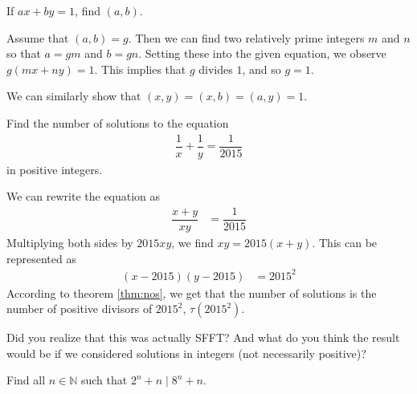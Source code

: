 \documentclass{subfile}
\begin{document}
		\begin{problem}
			If $ax+by=1$, find $(a,b)$.\label{prob:d1}
		\end{problem}

		\begin{solution}
			Assume that $(a,b)=g$. Then we can find two relatively prime integers $m$ and $n$ so that $a=gm$ and $b=gn$. Setting these into the given equation, we observe $g(mx+ny)=1$. This implies that $g$ divides $1$, and so $g=1$.
		\end{solution}

		\begin{note}
			We can similarly show that $(x,y)=(x,b)=(a,y)=1$.
		\end{note}

		\begin{problem}
			Find the number of solutions to the equation
			\begin{align*}
				\dfrac{1}{x}+\dfrac{1}{y}=\dfrac{1}{2015}
			\end{align*}
			in positive integers.
		\end{problem}

		\begin{solution}
			We can rewrite the equation as
				\begin{align*}
					\dfrac{x+y}{xy} & = \dfrac{1}{2015}
				\end{align*}
			Multiplying both sides by $2015xy$, we find $xy=2015(x+y)$. This can be represented as
				\begin{align*}
					(x-2015)(y-2015) & = 2015^2
				\end{align*}
			According to theorem \autoref{thm:nos}, we get that the number of solutions is the number of positive divisors of $2015^2$, $\tau(2015^2)$.
		\end{solution}

		\begin{note}
			Did you realize that this was actually SFFT? And what do you think the result would be if we considered solutions in integers (not necessarily positive)?
		\end{note}

		\begin{problem}
			Find all $n\in\mathbb{N}$ such that $2^n+n\mid 8^n+n$.
		\end{problem}
\end{document}
